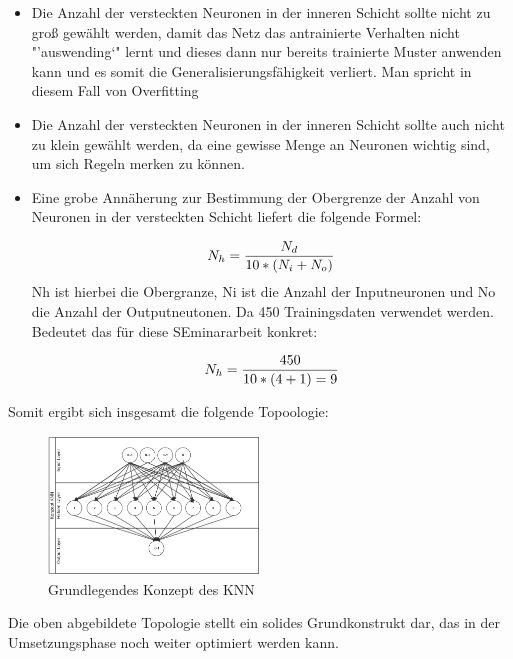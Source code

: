 \begin{itemize}
\item Die Anzahl der versteckten Neuronen in der inneren Schicht sollte nicht zu groß gewählt werden, damit das Netz das antrainierte Verhalten nicht "'auswending`" lernt und dieses dann nur bereits trainierte Muster anwenden kann und es somit die Generalisierungsfähigkeit verliert. Man spricht in diesem Fall von Overfitting 
\item Die Anzahl der versteckten Neuronen in der inneren Schicht sollte auch nicht zu klein gewählt werden, da eine gewisse Menge an Neuronen wichtig sind, um sich Regeln merken zu können.
\item Eine grobe Annäherung zur Bestimmung der Obergrenze der Anzahl von Neuronen in der versteckten Schicht liefert die folgende Formel:

\begin{equation}\formelentry{Optimale Anzahl Neuronen in der versteckten Schicht}
  N_h = \frac{N_d}{10*(N_i+N_o)}
\end{equation}
Nh ist hierbei die Obergranze, Ni ist die Anzahl der Inputneuronen und No die Anzahl der Outputneutonen. Da 450 Trainingsdaten verwendet werden. Bedeutet das für diese SEminararbeit konkret:

\begin{equation}\formelentry{Optimale Anzahl Neuronen in der versteckten Schicht}
  N_h = \frac{450}{10*(4+1) = 9 }   
\end{equation}
\end{itemize}
 

Somit ergibt sich insgesamt die folgende Topoologie:

\begin{figure}[H]
\centering
		\includegraphics[width=0.5\textwidth]{KonzKNN.png}
	\caption{Grundlegendes Konzept des KNN}
	\label{fig:Grundlegendes Konzept des KNN}
\end{figure}


Die oben abgebildete Topologie stellt ein solides Grundkonstrukt dar, das in der Umsetzungsphase noch weiter optimiert werden kann.


